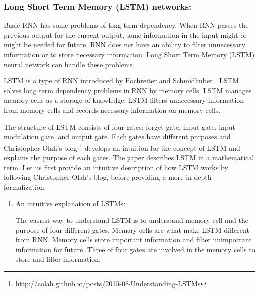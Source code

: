\documentclass[draft,dvipsnames]{drexel-thesis}
\begin{document}
\begin{thesis}
\subsubsection{Long Short Term Memory (LSTM) networks:}\label{LSTM}
	Basic RNN has some problems of long term dependency. When RNN passes the previous output for the current output, some information in the input might or might be needed for future. RNN does not have an ability to filter unnecessary information or to store necessary information. Long Short Term Memory (LSTM) neural network can handle these problems.

	LSTM is a type of RNN introduced by Hochreiter and Schmidhuber \cite{hochreiter1997long}. LSTM solves long term dependency problems in RNN by memory cells. LSTM manages memory cells as a storage of knowledge. LSTM filters unnecessary information from memory cells and records necessary information on memory cells.

	The structure of LSTM consists of four gates: forget gate, input gate, input modulation gate, and output gate. Each gates have different purposes and Christopher Olah's blog \footnote{\url{http://colah.github.io/posts/2015-08-Understanding-LSTMs}} develops an intuition for the concept of LSTM and explains the purpose of each gates. The paper \cite{zaremba2014recurrent}  describes LSTM in a mathematical term. Let us first provide an intuitive description of how LSTM works by following Christopher Olah's blog, before providing a more in-depth formalization.



\begin{enumerate}
\item An intuitive explanation of LSTMs:

	The easiest way to understand LSTM is to understand memory cell and the purpose of four different gates. Memory cells are what make LSTM different from RNN. Memory cells store important information and filter unimportant information for future. Three of four gates are involved in the memory cells to store and filter information.


\end{enumerate}
\end{thesis}
\end{document}
